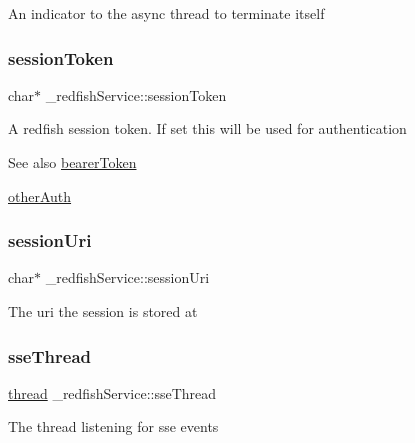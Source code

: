 An indicator to the async thread to terminate itself \mbox{\label{struct__redfishService_ac8aa0c23ac4b611dc593c86be30633bc}} 
\subsubsection{\texorpdfstring{session\+Token}{sessionToken}}
{\footnotesize\ttfamily char$\ast$ \+\_\+redfish\+Service\+::session\+Token}

A redfish session token. If set this will be used for authentication

\begin{DoxySeeAlso}{See also}
\hyperlink{struct__redfishService_a3959db858c9b279bcf379fc0a5eb7419}{bearer\+Token} 

\hyperlink{struct__redfishService_ac609c13e425bcdfbaaccd756c710a069}{other\+Auth} 
\end{DoxySeeAlso}
\mbox{\label{struct__redfishService_ae4d4e7c7b6ad947f2ea0cf06c9980557}} 
\subsubsection{\texorpdfstring{session\+Uri}{sessionUri}}
{\footnotesize\ttfamily char$\ast$ \+\_\+redfish\+Service\+::session\+Uri}

The uri the session is stored at \mbox{\label{struct__redfishService_a5cfc99e21117bbb500b618c4c29fdff0}} 
\subsubsection{\texorpdfstring{sse\+Thread}{sseThread}}
{\footnotesize\ttfamily \hyperlink{queue_8h_a1ab4f928aeccce6e6996ee96a4059c8a}{thread} \+\_\+redfish\+Service\+::sse\+Thread}

The thread listening for sse events \mbox{\label{struct__redfishService_a352a6086f7d45aa2263fdf867dd97a2a}} 
